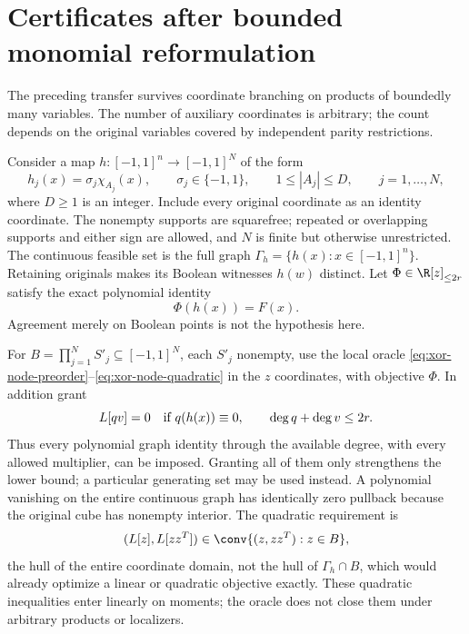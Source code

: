 \section{Certificates after bounded monomial reformulation}
\label{sec:monomial-reformulation}
The preceding transfer survives coordinate branching on products of
boundedly many variables. The number of auxiliary coordinates is
arbitrary; the count depends on the original variables covered by
independent parity restrictions.

Consider a map $h:[-1,1]^n\to[-1,1]^N$ of the form
\begin{equation}\label{eq:signed-monomial-map}
 h_j(x)=\sigma_j\chi_{A_j}(x),\qquad
 \sigma_j\in\{-1,1\},\qquad 1\le|A_j|\le D,
 \qquad j=1,\ldots,N,
\end{equation}
where $D\ge1$ is an integer. Include every original coordinate as an
identity coordinate. The nonempty supports are squarefree; repeated or
overlapping supports and either sign are allowed, and $N$ is finite but
otherwise unrestricted. The continuous feasible set is the full graph
$\Gamma_h=\{h(x):x\in[-1,1]^n\}$. Retaining originals makes its Boolean
witnesses $h(w)$ distinct. Let $\Phi\in\R[z]_{\le2r}$ satisfy the exact
polynomial identity
\begin{equation}\label{eq:lift-objective-pullback}
 \Phi(h(x))=F(x).
\end{equation}
Agreement merely on Boolean points is not the hypothesis here.

For $B=\prod_{j=1}^N S'_j\subseteq[-1,1]^N$, each $S'_j$ nonempty,
use the local oracle \eqref{eq:xor-node-preorder}--\eqref{eq:xor-node-quadratic}
in the $z$ coordinates, with objective $\Phi$. In addition grant
\begin{equation}\label{eq:lift-all-identities}
 L[qv]=0\quad\hbox{if }q(h(x))\equiv0,
 \qquad\deg q+\deg v\le2r.
\end{equation}
Thus every polynomial graph identity through the available degree, with
every allowed multiplier, can be imposed. Granting all of them only
strengthens the lower bound; a particular generating set may be used
instead.
A polynomial vanishing on the entire continuous graph has identically
zero pullback because the original cube has nonempty interior.
The quadratic requirement is
\begin{equation}\label{eq:lift-box-hull}
 (L[z],L[zz^T])\in\conv\{(z,zz^T):z\in B\},
\end{equation}
the hull of the entire coordinate domain, not the hull of
$\Gamma_h\cap B$, which would already optimize a linear or quadratic
objective exactly. These quadratic inequalities enter linearly on moments;
the oracle does not close them under arbitrary products or localizers.

